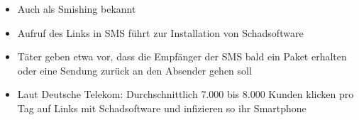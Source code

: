 \begin{frame}
\begin{itemize}
  \item Auch als Smishing bekannt
  \item Aufruf des Links in SMS führt zur Installation von Schadsoftware
  \item Täter geben etwa vor, dass die Empfänger der SMS bald ein Paket erhalten oder eine Sendung zurück an den Absender gehen soll
  \item Laut Deutsche Telekom: Durchschnittlich 7.000 bis 8.000 Kunden klicken pro Tag auf Links mit Schadsoftware und infizieren so ihr Smartphone
\end{itemize}
\end{frame}



